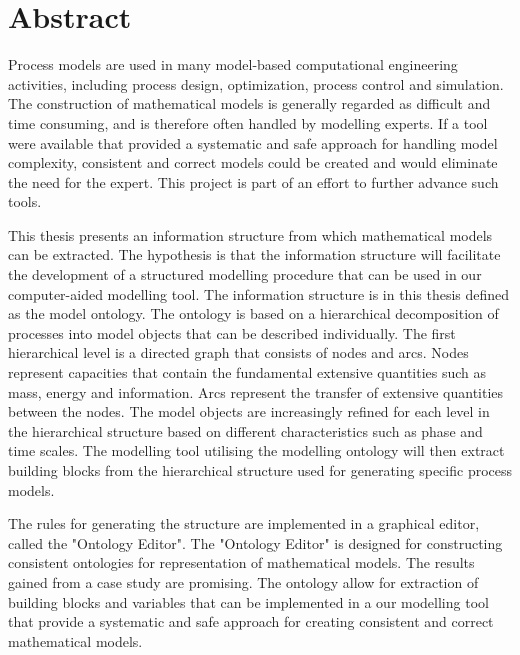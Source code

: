 
\chapter*{Abstract} %
\label{cha:abstract}

Process models are used in many model-based computational engineering activities, including process design, optimization, process control and simulation.
The construction of mathematical models is generally regarded as difficult and time consuming, and is therefore often handled by modelling experts.
If a tool were available that provided a systematic and safe approach for handling model complexity, consistent and correct models could be created and would eliminate the need for the expert. This project is part of an effort to further advance such tools.

This thesis presents an information structure from which mathematical models can be extracted.
The hypothesis is that the information structure will facilitate the development of a structured modelling procedure that can be used in our computer-aided modelling tool.  %
The information structure is in this thesis defined as the model ontology.
The ontology is based on a hierarchical decomposition of processes into model objects that can be described individually.
The first hierarchical level is a directed graph that consists of nodes and arcs.
Nodes represent capacities that contain the fundamental extensive quantities such as mass, energy and information.
Arcs represent the transfer of extensive quantities between the nodes. 
The model objects are increasingly refined for each level in the hierarchical structure based on different characteristics such as phase and time scales. The modelling tool utilising the modelling ontology will then extract 
 building blocks from the hierarchical structure used for generating specific process models. 

The rules for generating the structure are implemented in a graphical editor, called the "Ontology Editor". 
The "Ontology Editor" is designed for constructing consistent ontologies for representation of mathematical models. 
The results gained from a case study are promising. The ontology allow for extraction of building blocks and variables that can be implemented in a our modelling tool that provide a systematic and safe approach for creating consistent and correct mathematical models.






